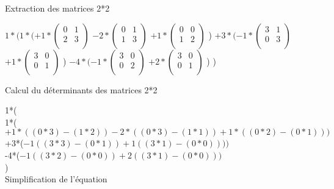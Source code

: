 \vspace{8mm} %
Extraction des matrices 2*2
\vspace{5mm} %

$
1*(1*(
+1*
\begin{pmatrix}
  0 & 1 \\
  2 & 3 \\
\end{pmatrix}
$
$
-2*
\begin{pmatrix}
  0 & 1 \\
  1 & 3 \\
\end{pmatrix}
$
$
+1*
\begin{pmatrix}
  0 & 0 \\
  1 & 2 \\
\end{pmatrix}
$
)
  $
  +3*(
  -1*
  \begin{pmatrix}
    3 & 1 \\
    0 & 3 \\
  \end{pmatrix}
  $
  $
  +1*
  \begin{pmatrix}
    3 & 0 \\
    0 & 1 \\
  \end{pmatrix}
  $
  )
  $
  -4*(
  -1*
  \begin{pmatrix}
    3 & 0 \\
    0 & 2 \\
  \end{pmatrix}
  $
  $
  +2*
  \begin{pmatrix}
    3 & 0 \\
    0 & 1 \\
  \end{pmatrix}
  $
  )
)

\newpage
\vspace{8mm} %
Calcul du déterminants des matrices 2*2
\vspace{5mm} %

1*(\\
  1*($+1*( (0*3) - (1*2)) -2*( (0*3) - (1*1)) +1*( (0*2) - (0*1)))$ \\
  +3*($ -1((3*3) - (0*1)) +1((3*1) - (0*0))))$ \\
  -4*($ -1((3*2) - (0*0)) +2((3*1) - (0*0)))$ \\
)\\



\vspace{4mm} %
Simplification de l'équation
\vspace{5mm} %

